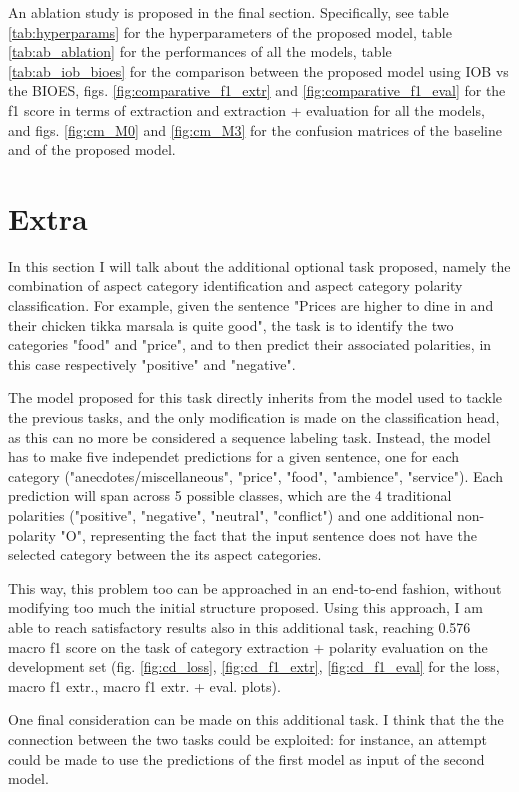 \documentclass[11pt,a4paper]{article}
\begin{document}
	An ablation study is proposed in the final section. Specifically, see table \ref{tab:hyperparams} for the hyperparameters of the proposed model, table 
	\ref{tab:ab_ablation} for the performances of all the models,
	table \ref{tab:ab_iob_bioes} for the comparison between the proposed model using
	IOB vs the BIOES, figs. \ref{fig:comparative_f1_extr} and
	\ref{fig:comparative_f1_eval} for the f1 score in terms
	of extraction and extraction + evaluation for all the models, and figs. \ref{fig:cm_M0} and \ref{fig:cm_M3} for the confusion matrices of the baseline and of the proposed model.
	
	\section{Extra}
	In this section I will talk about the additional optional task proposed, namely the combination of aspect category identification and aspect category polarity classification. For example, given the sentence "Prices are higher to dine in and their chicken tikka marsala is quite good", the task is to identify the two categories "food" and "price", and to then predict their associated polarities, in this case respectively "positive" and "negative".
	
	The model proposed for this task directly inherits from the model used to tackle the previous tasks, and the only modification is made on the classification head, as this can no more be considered a sequence labeling task. Instead, the model has to make five independet predictions for a given sentence, one for each category ("anecdotes/miscellaneous", "price", "food", "ambience", "service"). Each prediction will span across 5 possible classes, which are the 4 traditional polarities ("positive", "negative", "neutral", "conflict") and one additional non-polarity "O", representing the fact that the input sentence does not have the selected category between the its aspect categories.
	
	This way, this problem too can be approached in an end-to-end fashion, without modifying too much the initial structure proposed. Using this approach, I am able to reach satisfactory results also in this additional task, reaching 0.576 macro f1 score on the task of category extraction + polarity evaluation on the development set (fig. \ref{fig:cd_loss}, \ref{fig:cd_f1_extr}, \ref{fig:cd_f1_eval} for the loss, macro f1 extr., macro f1 extr. + eval. plots).
	
	One final consideration can be made on this additional task. I think that the the connection between the two tasks could be exploited: for instance, an attempt could be made to use the predictions of the first model as input of the second model.
	
\end{document}

